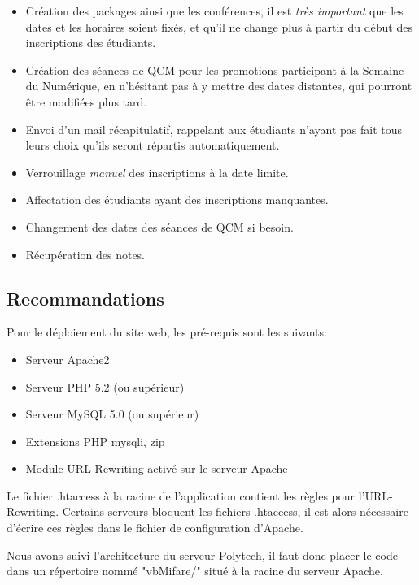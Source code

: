    \begin{itemize}
    \item Création des packages ainsi que les conférences, il est \emph{très important} que
           les dates et les horaires soient fixés, et qu'il ne change plus à partir du début des
           inscriptions des étudiants.
    \item Création des séances de QCM pour les promotions participant à la Semaine du Numérique,
           en n'hésitant pas à y mettre des dates distantes, qui pourront être modifiées plus tard.
    \item Envoi d'un mail récapitulatif, rappelant aux étudiants n'ayant pas fait tous leurs choix
           qu'ils seront répartis automatiquement.
    \item Verrouillage \emph{manuel} des inscriptions à la date limite.
    \item Affectation des étudiants ayant des inscriptions manquantes.
    \item Changement des dates des séances de QCM si besoin.
    \item Récupération des notes.
    \end{itemize}

        \subsection{Recommandations}

Pour le déploiement du site web, les pré-requis sont les suivants:

    \begin{itemize}
    \item Serveur Apache2
    \item Serveur PHP 5.2 (ou supérieur)
    \item Serveur MySQL 5.0 (ou supérieur)
    \item Extensions PHP mysqli, zip
    \item Module URL-Rewriting activé sur le serveur Apache
    \end{itemize}

Le fichier .htaccess à la racine de l'application contient les règles pour
l'URL-Rewriting. Certains serveurs bloquent les fichiers .htaccess, il est alors
nécessaire d'écrire ces règles dans le fichier de configuration d'Apache.

Nous avons suivi l'architecture du serveur Polytech, il faut donc placer le code
dans un répertoire nommé "vbMifare/" situé à la racine du serveur Apache.
